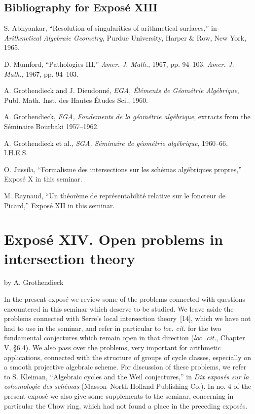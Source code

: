 \subsection*{Bibliography for Expos\'e XIII}
\begin{enumerate}[label={[\arabic*]}]
\item S. Abhyankar, ``Resolution of singularities of arithmetical surfaces,'' in \emph{Arithmetical Algebraic Geometry}, Purdue University, Harper \& Row, New York, 1965.
\item D. Mumford, ``Pathologies III,'' \emph{Amer. J. Math.}, 1967, pp. 94--103. \emph{Amer. J. Math.}, 1967, pp. 94--103.
\item A. Grothendieck and J. Dieudonn\'e, \emph{EGA, \'El\'ements de G\'eom\'etrie Alg\'ebrique}, Publ. Math. Inst. des Hautes \'Etudes Sci., 1960.
\item A. Grothendieck, \emph{FGA, Fondements de la g\'eom\'etrie alg\'ebrique}, extracts from the S\'eminaire Bourbaki 1957--1962.
\item A. Grothendieck et al., \emph{SGA, S\'eminaire de g\'eom\'etrie alg\'ebrique}, 1960--66, I.H.E.S.
\item O. Jussila, ``Formalisme des intersections sur les sch\'emas alg\'ebriques propres,'' Expos\'e X in this seminar.
\item M. Raynaud, ``Un th\'eor\`eme de repr\'esentabilit\'e relative sur le foncteur de Picard,'' Expos\'e XII in this seminar.
\end{enumerate}

\section*{Expos\'e XIV. Open problems in intersection theory}
\begin{center}
by A. Grothendieck
\end{center}

In the present expos\'e we review some of the problems connected with questions encountered in this seminar which deserve to be studied. We leave aside the problems connected with Serre's local intersection theory~[14], which we have not had to use in the seminar, and refer in particular to \emph{loc. cit.} for the two fundamental conjectures which remain open in that direction (\emph{loc. cit.}, Chapter V, \S6.4). We also pass over the problems, very important for arithmetic applications, connected with the structure of groups of cycle classes, especially on a smooth projective algebraic scheme. For discussion of these problems, we refer to S. Kleiman, ``Algebraic cycles and the Weil conjectures,'' in \emph{Dix expos\'es sur la cohomologie des sch\'emas} (Masson--North Holland Publishing Co.). In no. 4 of the present expos\'e we also give some supplements to the seminar, concerning in particular the Chow ring, which had not found a place in the preceding expos\'es.

